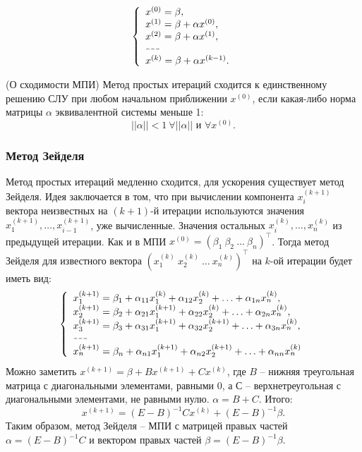 \begin{multicols}{2}
    \[
        \left\{
            \begin{array}{l}
                x^{(0)} = \beta,\\
                x^{(1)} = \beta + \alpha x^{(0)},\\
                x^{(2)} = \beta + \alpha x^{(1)},\\
                \hdash \\
                x^{(k)} = \beta + \alpha x^{(k-1)}.
            \end{array}
         \right.  
    \]
    \begin{theorema}{(О сходимости МПИ)}{}
        Метод простых итераций сходится к единственному решению СЛУ при любом начальном приближении $x^{(0)}$, если какая-либо норма матрицы $\alpha$ эквивалентной системы меньше 1:
        \[
            ||\alpha|| < 1\ \forall ||\alpha || \text{ и } \forall x^{(0)}.  
        \]
    \end{theorema}
    \subsubsection*{Метод Зейделя}
    Метод простых итераций медленно сходится, для ускорения существует метод Зейделя. Идея заключается в том, что при вычислении компонента $x_i^{(k+1)}$ вектора неизвестных на $(k+1)$-й итерации используются значения $x_1^{(k+1)}, \ldots, x_{i-1}^{(k+1)}$, уже вычисленные. Значения остальных $x_{i}^{(k)}, \ldots, x_{n}^{(k)}$ из предыдущей итерации. Как и в МПИ \mbox{$x^{(0)} = (\beta_1 \ \beta_2 \ \ldots \ \beta_n)^\intercal$}. Тогда метод Зейделя для известного вектора $\left(x_1^{(k)} \ x_2^{(k)} \ \ldots \ x_{n}^{(k)}\right)^\intercal$ на $k$-ой итерации будет иметь вид:
    \[
        \left\{
            \begin{array}{l}
                x_1^{(k+1)} = \beta_1 + \alpha_{11}x_1^{(k)} + \alpha_{12}x_2^{(k)} + \ldots + \alpha_{1n}x_n^{(k)},\\
                x_2^{(k+1)} = \beta_2 + \alpha_{21}x_1^{(k+1)} + \alpha_{22}x_2^{(k)} + \ldots + \alpha_{2n}x_n^{(k)},\\
                x_3^{(k+1)} = \beta_3 + \alpha_{31}x_1^{(k+1)} + \alpha_{32}x_2^{(k+1)} + \ldots + \alpha_{3n}x_n^{(k)}, \\
                \hdash\\
                x_n^{(k+1)} = \beta_n + \alpha_{n1}x_1^{(k+1)} + \alpha_{n2}x_2^{(k+1)} + \ldots + \alpha_{nn}x_n^{(k)}
            \end{array}
        \right.
    \]
    Можно заметить $x^{(k+1)} = \beta + Bx^{(k+1)} + Cx^{(k)}$, где $B$ -- нижняя треугольная матрица с диагональными элементами, равными 0, а $С$ -- верхнетреугольная с диагональными элементами, не равными нулю. $\alpha = B + C$. Итого:
    \[
            x^{(k+1)} = (E-B)^{-1}Cx^{(k)} + (E-B)^{-1}\beta.
    \]
    Таким образом, метод Зейделя -- МПИ с матрицей правых частей $\alpha = (E-B)^{-1}C$ и вектором правых частей $\beta = (E-B)^{-1}\beta.$

\end{multicols}
